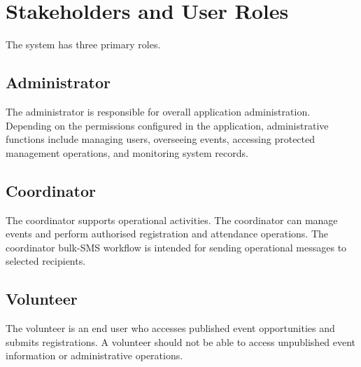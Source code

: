 \documentclass[12pt,a4paper,oneside]{report}
\begin{document}
\section{Stakeholders and User Roles}
The system has three primary roles.

\subsection{Administrator}
The administrator is responsible for overall application administration. Depending on the permissions configured in the application, administrative functions include managing users, overseeing events, accessing protected management operations, and monitoring system records.

\subsection{Coordinator}
The coordinator supports operational activities. The coordinator can manage events and perform authorised registration and attendance operations. The coordinator bulk-SMS workflow is intended for sending operational messages to selected recipients.

\subsection{Volunteer}
The volunteer is an end user who accesses published event opportunities and submits registrations. A volunteer should not be able to access unpublished event information or administrative operations.
\end{document}

